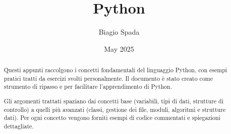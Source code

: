 \documentclass[a4paper, 12pt]{article}
\title{Python}
\author{Biagio Spada}
\date{May 2025}
\begin{document}
\maketitle

\begin{abstract}
Questi appunti raccolgono i concetti fondamentali del linguaggio Python, con esempi pratici tratti da esercizi svolti personalmente. Il documento è stato creato come strumento di ripasso e per facilitare l'apprendimento di Python.

Gli argomenti trattati spaziano dai concetti base (variabili, tipi di dati, strutture di controllo) a quelli più avanzati (classi, gestione dei file, moduli, algoritmi e strutture dati). Per ogni concetto vengono forniti esempi di codice commentati e spiegazioni dettagliate.
\end{abstract}

\newpage
\tableofcontents
\newpage




























\end{document}
